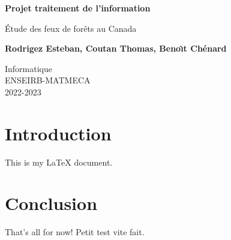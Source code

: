 \documentclass{article}
\begin{document}
\begin{titlepage}
    \begin{center}
        \vspace*{6cm}
 
        \textbf{\huge{Projet traitement de l'information}}
 
        \vspace{0.5cm}
        \large{\'Etude des feux de for\^ets au Canada}
             
        \vspace{1.5cm}
 
        \textbf{Rodrigez Esteban, Coutan Thomas, Beno\^\i t Ch\'enard}
 
        \vfill
        Informatique\\
        ENSEIRB-MATMECA\\
        2022-2023 
    \end{center}
 \end{titlepage}

\renewcommand\contentsname{Table des mati\`eres}
\tableofcontents
\newpage

\section{Introduction}

This is my LaTeX document.

\section{Conclusion}

That's all for now! Petit test vite fait.
\end{document}
